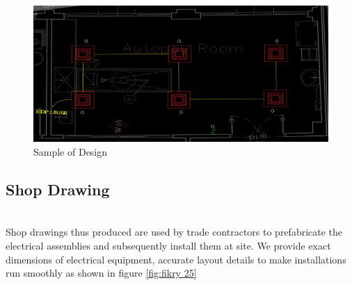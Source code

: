 \documentclass[12pt,fleqn]{book} %
\begin{document}
  \begin{figure}[!h]
    \centering
    \includegraphics[width=1\linewidth]{f 5.png}
    \caption{Sample of Design}
    \label{fig:f 5}
\end{figure}





\newpage
\subsection{Shop Drawing}
\\Shop drawings thus produced are used by trade contractors to prefabricate the electrical assemblies and subsequently install them at site. We provide exact dimensions of electrical equipment, accurate layout details to make installations run smoothly as shown in figure \ref{fig:fikry 25}
   
\end{document}
